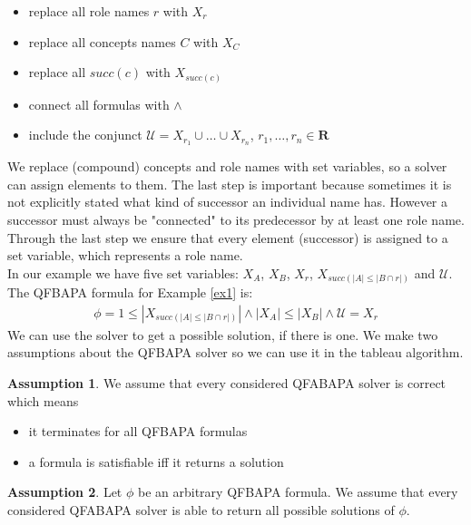 \documentclass{book}
\theoremstyle{break}
\theoremstyle{definition}
\newtheorem{assumption}{Assumption}
\begin{document}
\begin{itemize}
\item replace all role names $r$ with $X_r$
\item replace all concepts names $C$ with $X_C$
\item replace all $succ(c)$ with $X_{succ(c)}$
\item connect all formulas with $\wedge$
\item include the conjunct $\mathcal{U}=X_{r_1}\cup\dots\cup X_{r_n}$, $r_1,\dots, r_n\in\mathbf{R}$
\end{itemize}
We replace (compound) concepts and role names with set variables, so a solver can assign elements to them. The last step is important because sometimes it is not explicitly stated what kind of successor an individual name has. However a successor must always be "connected" to its predecessor by at least one role name. Through the last step we ensure that every element (successor) is assigned to a set variable, which represents a role name.\\
In our example we have five set variables: $X_A$, $X_B$, $X_r$, $X_{succ(|A|\leq |B\cap r|)}$ and $\mathcal{U}$. The QFBAPA formula for Example \ref{ex1} is:
\begin{align}\label{f}
\phi=1\leq |X_{succ(|A|\leq |B\cap r|)}|\wedge |X_A|\leq |X_B|\wedge \mathcal{U}=X_r
\end{align}
We can use the solver to get a possible solution, if there is one. We make two assumptions about the QFBAPA solver so we can use it in the tableau algorithm.
\begin{assumption}\label{assumption1}
We assume that every considered QFABAPA solver is correct which means
\begin{itemize}
\item it terminates for all QFBAPA formulas
\item a formula is satisfiable iff it returns a solution
\end{itemize}
\end{assumption}
\begin{assumption}\label{assumption2}
Let $\phi$ be an arbitrary QFBAPA formula. We assume that every considered QFABAPA solver is able to return all possible solutions of $\phi$.
\end{assumption}
\end{document}
